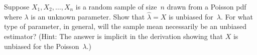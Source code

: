 \begin{problem}
   Suppose $X_1,X_2,\ldots,X_n$ is a random sample of size~$n$ drawn from a Poisson pdf where $\lambda$ is an unknown parameter. Show that ${\hat{\lambda} = X}$ is unbiased for~$\lambda$. For what type of parameter, in general, will the sample mean necessarily be an unbiased estimator? (Hint: The answer is implicit in the derivation showing that $X$ is unbiased for the Poisson~$\lambda$.)
\end{problem}
